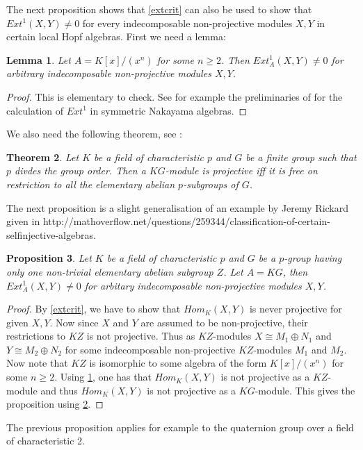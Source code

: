 \documentclass[a4paper]{amsart}
\newtheorem{theorem}{Theorem}[section]
\newtheorem{lemma}[theorem]{Lemma}
\newtheorem{proposition}[theorem]{Proposition}
\theoremstyle{definition}
\theoremstyle{remark}
\numberwithin{equation}{theorem}
\begin{document}
The next proposition shows that \ref{extcrit} can also be used to show that $Ext^{1}(X,Y) \neq 0$ for every indecomposable non-projective modules $X,Y$ in certain local Hopf algebras. First we need a lemma:
\begin{lemma} \label{kxlemma}
Let $A=K[x]/(x^n)$ for some $n \geq 2$. Then $Ext_A^{1}(X,Y) \neq 0$ for arbitrary indecomposable non-projective modules $X,Y$.

\end{lemma}
\begin{proof}
This is elementary to check. See for example the preliminaries of \cite{ChMar} for the calculation of $Ext^1$ in symmetric Nakayama algebras.
\end{proof}
We also need the following theorem, see \cite{Ch}:
\begin{theorem} \label{chtheorem}
Let $K$ be a field of characteristic $p$ and $G$ be a finite group such that $p$ divdes the group order. Then a $KG$-module is projective iff it is free on restriction to all the elementary abelian $p$-subgroups of $G$.
\end{theorem}
The next proposition is a slight generalisation of an example by Jeremy Rickard given in http://mathoverflow.net/questions/259344/classification-of-certain-selfinjective-algebras.
\begin{proposition}
Let $K$ be a field of characteristic $p$ and $G$ be a $p$-group having only one non-trivial elementary abelian subgroup $Z$. Let $A=KG$,
then $Ext_A^{1}(X,Y) \neq 0$ for arbitary indecomposable non-projective modules $X,Y$. 
\end{proposition}
\begin{proof}
By \ref{extcrit}, we have to show that $Hom_K(X,Y)$ is never projective for given $X,Y$. Now since $X$ and $Y$ are assumed to be non-projective, their restrictions to $KZ$ is not projective. Thus as $KZ$-modules $X \cong M_1 \oplus N_1$ and $Y \cong M_2 \oplus N_2$ for some indecomposable non-projective $KZ$-modules $M_1$ and $M_2$. Now note that $KZ$ is isomorphic to some algebra of the form $K[x]/(x^n)$ for some $n \geq 2$. Using \ref{kxlemma}, one has that $Hom_K(X,Y)$ is not projective as a $KZ$-module and thus $Hom_K(X,Y)$ is not projective as a $KG$-module. This gives the proposition using \ref{chtheorem}.
\end{proof}
The previous proposition applies for example to the quaternion group over a field of characteristic 2.
\end{document}
